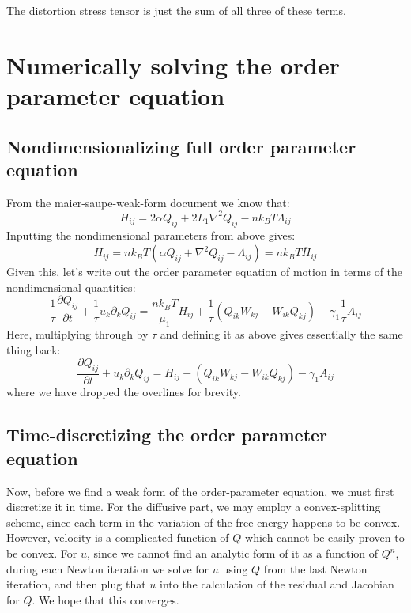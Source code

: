 \documentclass[reqno]{article}
\begin{document}
  The distortion stress tensor is just the sum of all three of these terms.

  \section{Numerically solving the order parameter equation}
  \subsection{Nondimensionalizing full order parameter equation}
  From the maier-saupe-weak-form document we know that:
  \begin{equation}
    H_{ij}
    =
    2 \alpha Q_{ij}
    + 2 L_1 \nabla^2 Q_{ij}
    - n k_B T \Lambda_{ij}
  \end{equation}
  Inputting the nondimensional parameters from above gives:
  \begin{equation}
    H_{ij}
    =
    n k_B T \left(
      \alpha Q_{ij}
      + \nabla^2 Q_{ij}
      - \Lambda_{ij}
    \right)
    = n k_B T
    \overline{H}_{ij}
  \end{equation}
  Given this, let's write out the order parameter equation of motion in terms of
  the nondimensional quantities:
  \begin{equation}
    \frac{1}{\tau} \frac{\partial Q_{ij}}{\partial t}
    + \frac{1}{\tau} \overline{u}_k \partial_k Q_{ij}
    =
    \frac{n k_B T}{\mu_1} \overline{H}_{ij}
    + \frac{1}{\tau} (Q_{ik} \overline{W}_{kj} - \overline{W}_{ik} Q_{kj})
    - \gamma_1 \frac{1}{\tau} \overline{A}_{ij}
  \end{equation}
  Here, multiplying through by $\tau$ and defining it as above gives essentially
  the same thing back:
  \begin{equation}
    \frac{\partial Q_{ij}}{\partial t}
    + u_k \partial_k Q_{ij}
    =
    H_{ij}
    + (Q_{ik} W_{kj} - W_{ik} Q_{kj})
    - \gamma_1 A_{ij}
  \end{equation}
  where we have dropped the overlines for brevity.

  \subsection{Time-discretizing the order parameter equation}
  Now, before we find a weak form of the order-parameter equation, we must first
  discretize it in time.
  For the diffusive part, we may employ a convex-splitting scheme, since each
  term in the variation of the free energy happens to be convex.
  However, velocity is a complicated function of $Q$ which cannot be easily
  proven to be convex.
  For $u$, since we cannot find an analytic form of it as a function of $Q^n$,
  during each Newton iteration we solve for $u$ using $Q$ from the last Newton
  iteration, and then plug that $u$ into the calculation of the residual and
  Jacobian for $Q$.
  We hope that this converges.
\end{document}
